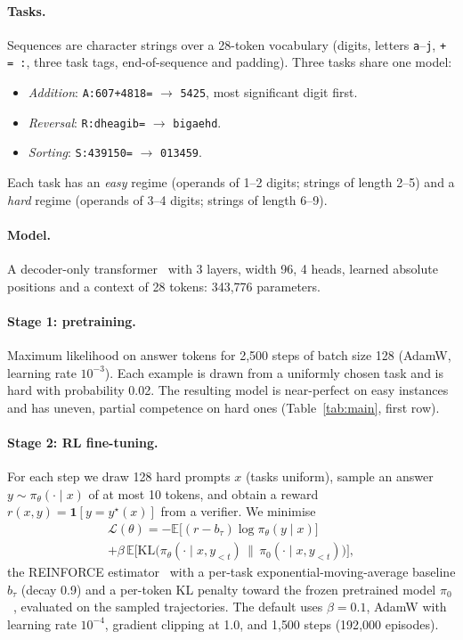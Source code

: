 \documentclass[10pt,twocolumn]{article}
\newcommand{\E}{\mathbb{E}}
\begin{document}
\paragraph{Tasks.} Sequences are character strings over a 28-token vocabulary (digits, letters
\texttt{a}--\texttt{j}, \texttt{+ = :}, three task tags, end-of-sequence and padding). Three tasks
share one model:
\begin{itemize}
\itemsep0pt
\item \emph{Addition}: \texttt{A:607+4818=} $\to$ \texttt{5425}, most significant digit first.
\item \emph{Reversal}: \texttt{R:dheagib=} $\to$ \texttt{bigaehd}.
\item \emph{Sorting}: \texttt{S:439150=} $\to$ \texttt{013459}.
\end{itemize}
Each task has an \emph{easy} regime (operands of 1--2 digits; strings of length 2--5) and a
\emph{hard} regime (operands of 3--4 digits; strings of length 6--9).

\paragraph{Model.} A decoder-only transformer~\cite{vaswani2017} with 3 layers, width 96, 4 heads,
learned absolute positions and a context of 28 tokens: 343{,}776 parameters.

\paragraph{Stage 1: pretraining.} Maximum likelihood on answer tokens for 2{,}500 steps of batch
size 128 (AdamW, learning rate $10^{-3}$). Each example is drawn from a uniformly chosen task and is
hard with probability 0.02. The resulting model is near-perfect on easy instances and has uneven,
partial competence on hard ones (Table~\ref{tab:main}, first row).

\paragraph{Stage 2: RL fine-tuning.} For each step we draw 128 hard prompts $x$ (tasks uniform),
sample an answer $y \sim \pi_\theta(\cdot\mid x)$ of at most 10 tokens, and obtain a reward
$r(x,y)=\mathbf{1}[y=y^\star(x)]$ from a verifier. We minimise
\begin{multline*}
\mathcal{L}(\theta) = -\E\big[(r - b_{\tau})\log \pi_\theta(y\mid x)\big] \\
 + \beta\,\E\big[\mathrm{KL}\big(\pi_\theta(\cdot\mid x,y_{<t})\,\|\,\pi_{0}(\cdot\mid x,y_{<t})\big)\big],
\end{multline*}
the REINFORCE estimator~\cite{williams1992} with a per-task exponential-moving-average baseline
$b_\tau$ (decay 0.9) and a per-token KL penalty toward the frozen pretrained model
$\pi_0$~\cite{jaques2017}, evaluated on the sampled trajectories. The default uses $\beta=0.1$,
AdamW with learning rate $10^{-4}$, gradient clipping at 1.0, and 1{,}500 steps (192{,}000 episodes).
\end{document}
